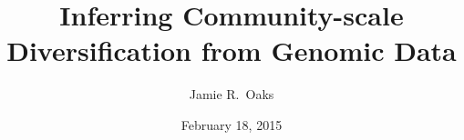 

\newcommand{\allParameters}[1]{\ensuremath{\theta_{#1}}\xspace}



\title[Inferring community history]{Inferring Community-scale Diversification
    from Genomic Data}

\author[J.\ Oaks]{
    Jamie R.\ Oaks
}

\date{February 18, 2015}


\maketitle


